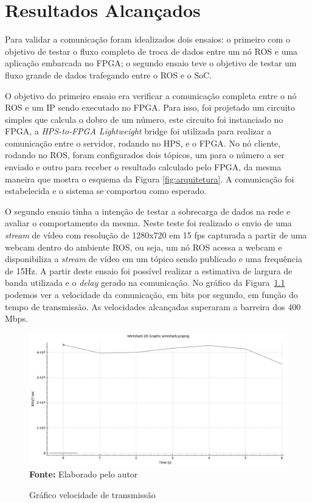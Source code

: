 \chapter{Resultados Alcançados}\label{cap:result}

Para validar a comunicação foram idealizados dois ensaios: o primeiro com o objetivo de testar o fluxo completo de troca de dados entre um nó ROS e uma aplicação embarcada no FPGA; o segundo ensaio teve o objetivo de testar um fluxo grande de dados trafegando entre o ROS e o SoC.

O objetivo do primeiro ensaio era verificar a comunicação completa entre o nó ROS e um IP sendo executado no FPGA. Para isso,  foi projetado um circuito simples que calcula o dobro de um número,  este circuito foi instanciado no FPGA, a \textit{HPS-to-FPGA Lightweight} bridge foi utilizada para realizar a comunicação entre o servidor, rodando no HPS, e o FPGA. No nó cliente, rodando no ROS, foram configurados dois tópicos, um para o número a ser enviado e outro para receber o resultado calculado pelo FPGA, da mesma maneira que mostra o esquema da Figura \ref{fig:arquitetura}. A comunicação foi estabelecida e o sistema se comportou como esperado.

O segundo ensaio tinha a intenção de testar a sobrecarga de dados na rede e avaliar o comportamento da mesma. Neste teste foi realizado o envio de uma \textit{stream} de vídeo com resolução de 1280x720 em 15 fps capturada a partir de uma webcam dentro do ambiente ROS, ou seja, um nó ROS acessa a webcam e disponibiliza a \textit{stream} de vídeo em um tópico sendo publicado e uma frequência de 15Hz. A partir deste ensaio foi possível realizar a estimativa de largura de banda utilizada e o \textit{delay} gerado na comunicação. No gráfico da Figura~\ref{fig:speed} podemos ver a velocidade da comunicação, em bits por segundo, em função do tempo de transmissão. As velocidades alcançadas superaram a barreira dos 400 Mbps.

\begin{figure}[ht]
	\caption{Gráfico velocidade de transmissão}
	\begin{center}
		\includegraphics[scale=0.42]{imagens/speed.jpg}\\
		{\small \textbf{Fonte:} Elaborado pelo autor}
    \end{center}\label{fig:speed}
\end{figure}

